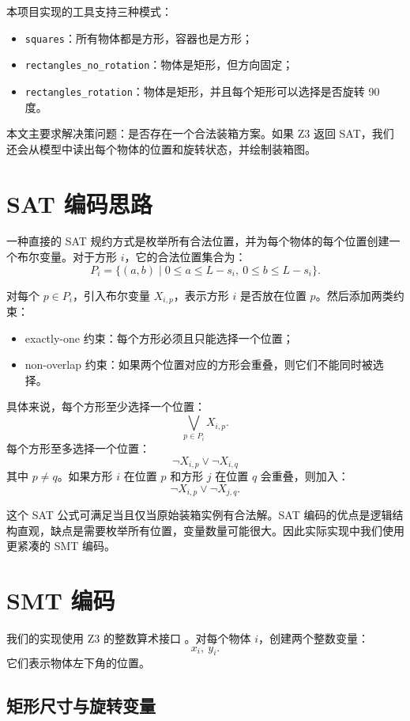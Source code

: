 \documentclass[UTF8,11pt]{ctexart}
\begin{document}
本项目实现的工具支持三种模式：
\begin{itemize}
    \item \texttt{squares}：所有物体都是方形，容器也是方形；
    \item \texttt{rectangles\_no\_rotation}：物体是矩形，但方向固定；
    \item \texttt{rectangles\_rotation}：物体是矩形，并且每个矩形可以选择是否旋转 90 度。
\end{itemize}

本文主要求解决策问题：是否存在一个合法装箱方案。如果 Z3 返回 SAT，我们还会从模型中读出每个物体的位置和旋转状态，并绘制装箱图。

\section{SAT 编码思路}

一种直接的 SAT 规约方式是枚举所有合法位置，并为每个物体的每个位置创建一个布尔变量。对于方形 \(i\)，它的合法位置集合为：
\[
P_i = \{(a,b) \mid 0 \leq a \leq L-s_i,\ 0 \leq b \leq L-s_i\}.
\]

对每个 \(p\in P_i\)，引入布尔变量 \(X_{i,p}\)，表示方形 \(i\) 是否放在位置 \(p\)。然后添加两类约束：
\begin{itemize}
    \item exactly-one 约束：每个方形必须且只能选择一个位置；
    \item non-overlap 约束：如果两个位置对应的方形会重叠，则它们不能同时被选择。
\end{itemize}

具体来说，每个方形至少选择一个位置：
\[
\bigvee_{p\in P_i} X_{i,p}.
\]
每个方形至多选择一个位置：
\[
\neg X_{i,p} \vee \neg X_{i,q}
\]
其中 \(p\neq q\)。如果方形 \(i\) 在位置 \(p\) 和方形 \(j\) 在位置 \(q\) 会重叠，则加入：
\[
\neg X_{i,p} \vee \neg X_{j,q}.
\]

这个 SAT 公式可满足当且仅当原始装箱实例有合法解。SAT 编码的优点是逻辑结构直观，缺点是需要枚举所有位置，变量数量可能很大。因此实际实现中我们使用更紧凑的 SMT 编码。

\section{SMT 编码}

我们的实现使用 Z3 的整数算术接口 \cite{deMoura2008z3}。对每个物体 \(i\)，创建两个整数变量：
\[
x_i,\ y_i.
\]
它们表示物体左下角的位置。

\subsection{矩形尺寸与旋转变量}
\end{document}
